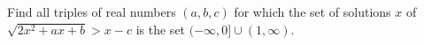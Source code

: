 Find all triples of real numbers $(a,b,c)$ for which the set of solutions $x$ of $\sqrt{2x^2 +ax+b} > x-c$ is the set $(-\infty,0]\cup(1,\infty)$.